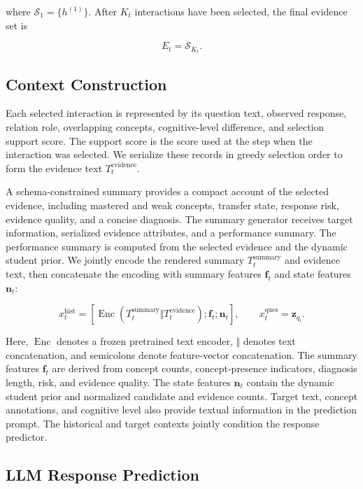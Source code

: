 \documentclass{llncs}
\begin{document}
where $\mathcal S_1=\{h^{(1)}\}$. After \(K_t\) interactions have been selected, the final evidence set is

\begin{equation}
E_t=\mathcal{S}_{K_t}.
\end{equation}

\subsection{Context Construction}

Each selected interaction is represented by its question text, observed response, relation role, overlapping concepts, cognitive-level difference, and selection support score. The support score is the score used at the step when the interaction was selected. We serialize these records in greedy selection order to form the evidence text $T_t^{\mathrm{evidence}}$.

A schema-constrained summary provides a compact account of the selected evidence, including mastered and weak concepts, transfer state, response risk, evidence quality, and a concise diagnosis. The summary generator receives target information, serialized evidence attributes, and a performance summary. The performance summary is computed from the selected evidence and the dynamic student prior. We jointly encode the rendered summary $T_t^{\mathrm{summary}}$ and evidence text, then concatenate the encoding with summary features $\mathbf f_t$ and state features $\mathbf n_t$:

\begin{equation}
x_t^{\mathrm{hist}}
=
[\operatorname{Enc}(T_t^{\mathrm{summary}}\Vert T_t^{\mathrm{evidence}});
\mathbf f_t;\mathbf n_t],
\qquad
x_t^{\mathrm{ques}}=\mathbf z_{q_t}.
\end{equation}

Here, $\operatorname{Enc}$ denotes a frozen pretrained text encoder, $\Vert$ denotes text concatenation, and semicolons denote feature-vector concatenation. The summary features $\mathbf f_t$ are derived from concept counts, concept-presence indicators, diagnosis length, risk, and evidence quality. The state features $\mathbf n_t$ contain the dynamic student prior and normalized candidate and evidence counts. Target text, concept annotations, and cognitive level also provide textual information in the prediction prompt. The historical and target contexts jointly condition the response predictor.

\subsection{LLM Response Prediction}
\end{document}
